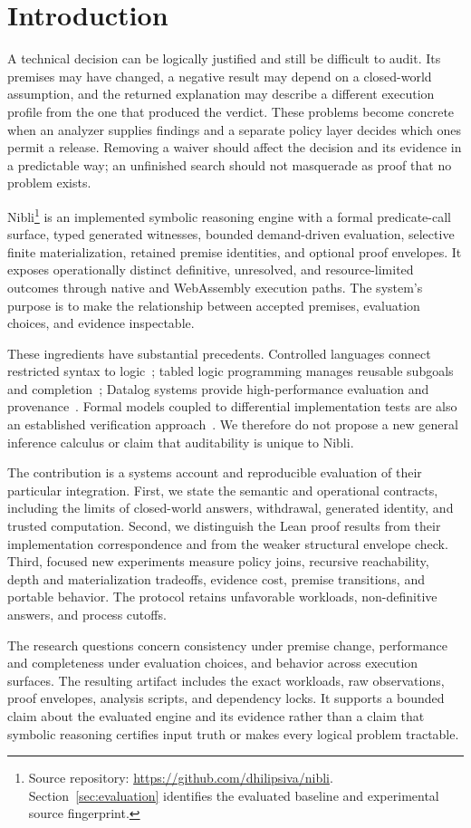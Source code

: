 \section{Introduction}

A technical decision can be logically justified and still be difficult to audit.
Its premises may have changed, a negative result may depend on a closed-world
assumption, and the returned explanation may describe a different execution
profile from the one that produced the verdict. These problems become concrete
when an analyzer supplies findings and a separate policy layer decides which
ones permit a release. Removing a waiver should affect the decision and its
evidence in a predictable way; an unfinished search should not masquerade as
proof that no problem exists.

Nibli\footnote{Source repository: \url{https://github.com/dhilipsiva/nibli}.
Section~\ref{sec:evaluation} identifies the evaluated baseline and experimental
source fingerprint.} is an implemented symbolic reasoning engine with a formal predicate-call
surface, typed generated witnesses, bounded demand-driven evaluation, selective
finite materialization, retained premise identities, and optional proof
envelopes. It exposes operationally distinct definitive, unresolved, and
resource-limited outcomes through native and WebAssembly execution paths.
The system's purpose is to make the relationship between accepted premises,
evaluation choices, and evidence inspectable.

These ingredients have substantial precedents. Controlled languages connect
restricted syntax to logic~\cite{ace}; tabled logic programming manages reusable
subgoals and completion~\cite{xsb}; Datalog systems provide high-performance
evaluation and provenance~\cite{souffle,souffle-provenance}. Formal models coupled
to differential implementation tests are also an established verification
approach~\cite{cedar}. We therefore do not propose a new general inference
calculus or claim that auditability is unique to Nibli.

The contribution is a systems account and reproducible evaluation of their
particular integration. First, we state the semantic and operational contracts,
including the limits of closed-world answers, withdrawal, generated identity,
and trusted computation. Second, we distinguish the Lean proof results from
their implementation correspondence and from the weaker structural envelope
check. Third, focused new experiments measure policy joins, recursive
reachability, depth and materialization tradeoffs, evidence cost, premise
transitions, and portable behavior. The protocol retains unfavorable workloads,
non-definitive answers, and process cutoffs.

The research questions concern consistency under premise change, performance
and completeness under evaluation choices, and behavior across execution
surfaces. The resulting artifact includes the exact workloads, raw observations,
proof envelopes, analysis scripts, and dependency locks. It supports a bounded
claim about the evaluated engine and its evidence rather than a claim that
symbolic reasoning certifies input truth or makes every logical problem tractable.
